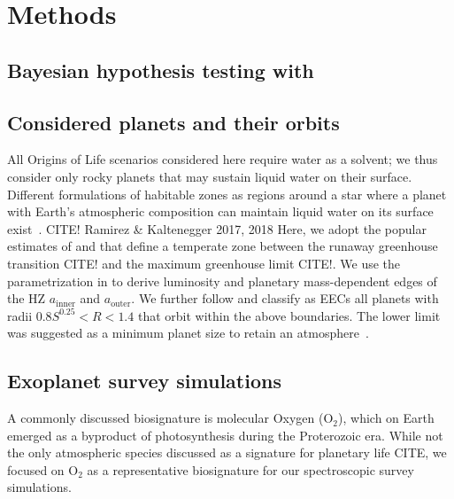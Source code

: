 \documentclass[modern,linenumbers]{aastex631}
\begin{document}
\section{Methods}
\label{sec:hypotests}
\subsection{Bayesian hypothesis testing with \bioverse}

\subsection{Considered planets and their orbits}
All Origins of Life scenarios considered here require water as a solvent; we thus consider only rocky planets that may sustain liquid water on their surface.
Different formulations of habitable zones as regions around a star where a planet with Earth's atmospheric composition can maintain liquid water on its surface exist~\citep[e.g.,][]{MolLous2022,Spinelli2023,Tuchow2023}. CITE! Ramirez \& Kaltenegger 2017, 2018
Here, we adopt the popular estimates of \citet{Kasting1993} and \citet{Kopparapu2013,Kopparapu2014} that define a temperate zone between the runaway greenhouse transition CITE! and the maximum greenhouse limit CITE!.
We use the parametrization in \citet{Kopparapu2014} to derive luminosity and planetary mass-dependent edges of the \gls{HZ} $a_\mathrm{inner}$ and $a_\mathrm{outer}$.
We further follow \citet{Bixel2021} and classify as \glspl{EEC} all planets with radii $0.8 S^{0.25} < R < 1.4 $ that orbit within the above boundaries.
The lower limit was suggested as a minimum planet size to retain an atmosphere~\citep{Zahnle2017}.


\subsection{Exoplanet survey simulations}
A commonly discussed biosignature is molecular Oxygen (O$_2$), which on Earth emerged as a byproduct of photosynthesis during the Proterozoic era.
While not the only atmospheric species discussed as a signature for planetary life CITE, we focused on O$_2$ as a representative biosignature for our spectroscopic survey simulations.
\end{document}
